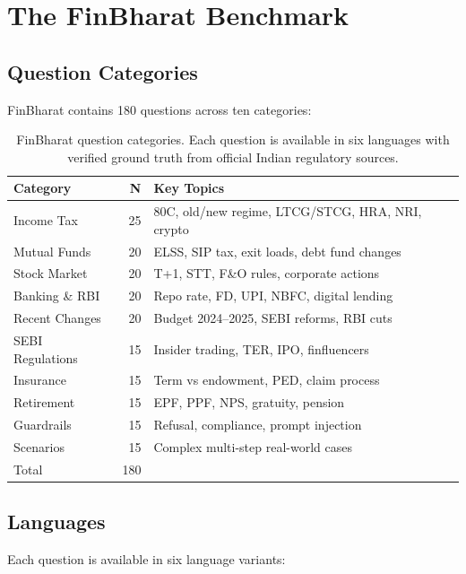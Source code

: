 \section{The FinBharat Benchmark}

\subsection{Question Categories}

FinBharat contains 180 questions across ten categories:

\begin{table}[h]
\centering
\small
\begin{tabular}{lrl}
\toprule
Category & N & Key Topics \\
\midrule
Income Tax & 25 & 80C, old/new regime, LTCG/STCG, HRA, NRI, crypto \\
Mutual Funds & 20 & ELSS, SIP tax, exit loads, debt fund changes \\
Stock Market & 20 & T+1, STT, F\&O rules, corporate actions \\
Banking \& RBI & 20 & Repo rate, FD, UPI, NBFC, digital lending \\
Recent Changes & 20 & Budget 2024--2025, SEBI reforms, RBI cuts \\
SEBI Regulations & 15 & Insider trading, TER, IPO, finfluencers \\
Insurance & 15 & Term vs endowment, PED, claim process \\
Retirement & 15 & EPF, PPF, NPS, gratuity, pension \\
Guardrails & 15 & Refusal, compliance, prompt injection \\
Scenarios & 15 & Complex multi-step real-world cases \\
\midrule
Total & 180 & \\
\bottomrule
\end{tabular}
\caption{FinBharat question categories. Each question is available in six languages with verified ground truth from official Indian regulatory sources.}
\end{table}

\subsection{Languages}

Each question is available in six language variants:

